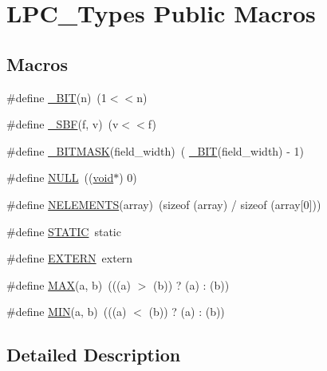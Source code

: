 \hypertarget{group___l_p_c___types___public___macros}{}\section{L\+P\+C\+\_\+\+Types Public Macros}
\label{group___l_p_c___types___public___macros}
\subsection*{Macros}
\begin{DoxyCompactItemize}
\item 
\#define \hyperlink{group___l_p_c___types___public___macros_ga7ee022f5e5a971a8324e4b7572d49170}{\+\_\+\+B\+IT}(n)~(1$<$$<$n)
\item 
\#define \hyperlink{group___l_p_c___types___public___macros_ga6caca3483c2ce446900be05ea02e8f49}{\+\_\+\+S\+BF}(f,  v)~(v$<$$<$f)
\item 
\#define \hyperlink{group___l_p_c___types___public___macros_ga78ad3421dde54769e8b46d36819ae87a}{\+\_\+\+B\+I\+T\+M\+A\+SK}(field\+\_\+width)~( \hyperlink{group___l_p_c___types___public___macros_ga7ee022f5e5a971a8324e4b7572d49170}{\+\_\+\+B\+IT}(field\+\_\+width) -\/ 1)
\item 
\#define \hyperlink{group___l_p_c___types___public___macros_ga070d2ce7b6bb7e5c05602aa8c308d0c4}{N\+U\+LL}~((\hyperlink{usb__devapi_8h_afabf60e7f57651d6d595a02c75f07cd0}{void}$\ast$) 0)
\item 
\#define \hyperlink{group___l_p_c___types___public___macros_gafdd9296176e56fcfd83c07d345a045a7}{N\+E\+L\+E\+M\+E\+N\+TS}(array)~(sizeof (array) / sizeof (array\mbox{[}0\mbox{]}))
\item 
\#define \hyperlink{group___l_p_c___types___public___macros_ga10b2d890d871e1489bb02b7e70d9bdfb}{S\+T\+A\+T\+IC}~static
\item 
\#define \hyperlink{group___l_p_c___types___public___macros_ga77366c1bd428629dc898e188bfd182a3}{E\+X\+T\+E\+RN}~extern
\item 
\#define \hyperlink{group___l_p_c___types___public___macros_gafa99ec4acc4ecb2dc3c2d05da15d0e3f}{M\+AX}(a,  b)~(((a) $>$ (b)) ? (a) \+: (b))
\item 
\#define \hyperlink{group___l_p_c___types___public___macros_ga3acffbd305ee72dcd4593c0d8af64a4f}{M\+IN}(a,  b)~(((a) $<$ (b)) ? (a) \+: (b))
\end{DoxyCompactItemize}


\subsection{Detailed Description}


